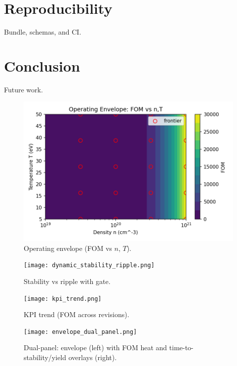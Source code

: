 \documentclass[11pt]{article}
\begin{document}
\section{Reproducibility}
Bundle, schemas, and CI.
\section{Conclusion}
Future work.
\begin{figure}[h]
\centering
\includegraphics[width=0.7\linewidth]{operating_envelope.png}
\caption{Operating envelope (FOM vs $n$, $T$).}\label{fig:envelope}
\end{figure}
\begin{figure}[h]
\centering
\texttt{[image: dynamic\_stability\_ripple.png]}
\caption{Stability vs ripple with gate.}\label{fig:ripple}
\end{figure}
\begin{figure}[h]
\centering
\texttt{[image: kpi\_trend.png]}
\caption{KPI trend (FOM across revisions).}\label{fig:kpi-trend}
\end{figure}
\begin{figure}[h]
\centering
\texttt{[image: envelope\_dual\_panel.png]}
\caption{Dual-panel: envelope (left) with FOM heat and time-to-stability/yield overlays (right).}
\end{figure}
\end{document}

